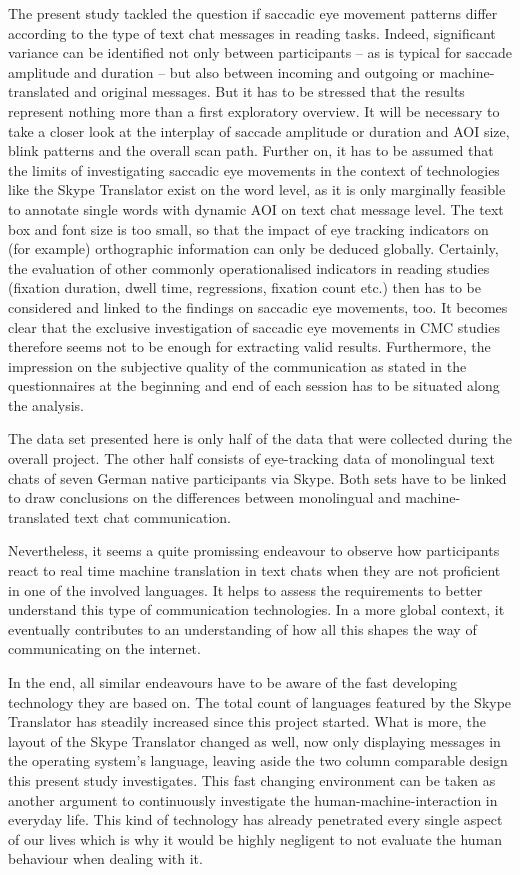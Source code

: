 \documentclass[output=paper,colorlinks,citecolor=brown]{langscibook}
\begin{document}
The present study tackled the question if saccadic eye movement patterns differ according to the type of text chat messages in reading tasks. Indeed, significant variance can be identified not only between participants -- as is typical for saccade amplitude and duration -- but also between incoming and outgoing or machine-translated and original messages. But it has to be stressed that the results represent nothing more than a first exploratory overview. It will be necessary to take a closer look at the interplay of saccade amplitude or duration and AOI size, blink patterns and the overall scan path. Further on, it has to be assumed that the limits of investigating saccadic eye movements in the context of technologies like the Skype Translator exist on the word level, as it is only marginally feasible to annotate single words with dynamic AOI on text chat message level. The text box and font size is too small, so that the impact of eye tracking indicators on (for example) orthographic information can only be deduced globally. Certainly, the evaluation of other commonly operationalised indicators in reading studies (fixation duration, dwell time, regressions, fixation count etc.) then has to be considered and linked to the findings on saccadic eye movements, too. It becomes clear that the exclusive investigation of saccadic eye movements in CMC studies therefore seems not to be enough for extracting valid results. Furthermore, the impression on the subjective quality of the communication as stated in the questionnaires at the beginning and end of each session has to be situated along the analysis.

The data set presented here is only half of the data that were collected during the overall project. The other half consists of eye-tracking data of monolingual text chats of seven German native participants via Skype. Both sets have to be linked to draw conclusions on the differences between monolingual and machine-translated text chat communication. 

Nevertheless, it seems a quite promissing endeavour to observe how participants react to real time machine translation in text chats when they are not proficient in one of the involved languages. It helps to assess the requirements to better understand this type of communication technologies. In a more global context, it eventually contributes to an understanding of how all this shapes the way of communicating on the internet. 

In the end, all similar endeavours have to be aware of the fast developing technology they are based on. The total count of languages featured by the Skype Translator has steadily increased since this project started. What is more, the layout of the Skype Translator changed as well, now only displaying messages in the operating system's language, leaving aside the two column comparable design this present study investigates. This fast changing environment can be taken as another argument to continuously investigate the human-machine-interaction in everyday life. This kind of technology has already penetrated every single aspect of our lives which is why it would be highly negligent to not evaluate the human behaviour when dealing with it.
\end{document}
